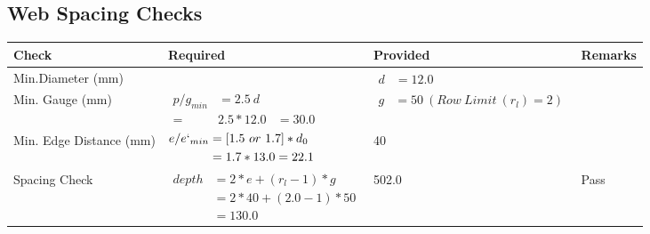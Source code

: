 \documentclass{article}%
\begin{document}
\subsection{Web Spacing Checks}%
\label{subsec:WebSpacingChecks}%
\renewcommand{\arraystretch}{1.2}%
\begin{longtable}{|p{2.5cm}|p{7.5cm}|p{5cm}|p{1cm}|}%
\hline%
\rowcolor{OsdagGreen}%
Check&Required&Provided&Remarks\\%
\hline%
\endhead%
\hline%
Min.Diameter (mm)&&$\begin{aligned} d &=12.0\end{aligned}$&\\%
\hline%
Min. Gauge (mm)&$\begin{aligned}p/g_{min}&= 2.5 ~ d&\\ =&2.5*12.0&=30.0\end{aligned}$&$\begin{aligned} g &=50~(Row~Limit~(r_l) = 2)\end{aligned}$&\\%
\hline%
Min. Edge Distance (mm)&$\begin{aligned}e/e`_{min} &=[1.5~or~ 1.7] * d_0\\ &=1.7*13.0=22.1 \end{aligned}$&40&\\%
\hline%
Spacing Check&$\begin{aligned} depth & = 2 * e + (r_l -1) * g\\ & = 2 * 40+(2.0-1)*50\\ & = 130.0\end{aligned}$&502.0&Pass\\%
\hline%
\end{longtable}

%
\newpage%
\end{document}
